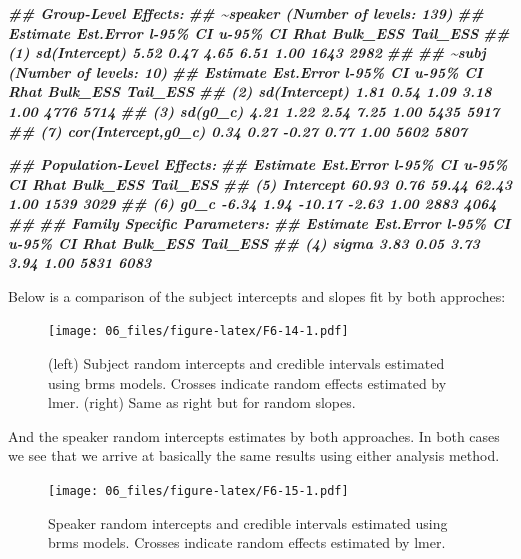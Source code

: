 \documentclass[
]{book}
\newenvironment{Shaded}{\begin{snugshade}}{\end{snugshade}}
\newcommand{\DocumentationTok}[1]{\textcolor[rgb]{0.56,0.35,0.01}{\textbf{\textit{#1}}}}
\begin{document}
\begin{Shaded}
\begin{Highlighting}[]
\DocumentationTok{\#\# Group{-}Level Effects: }
\DocumentationTok{\#\# \textasciitilde{}speaker (Number of levels: 139) }
\DocumentationTok{\#\#               Estimate Est.Error l{-}95\% CI u{-}95\% CI Rhat Bulk\_ESS Tail\_ESS}
\DocumentationTok{\#\# (1) sd(Intercept)     5.52      0.47     4.65     6.51 1.00     1643     2982}
\DocumentationTok{\#\# }
\DocumentationTok{\#\# \textasciitilde{}subj (Number of levels: 10) }
\DocumentationTok{\#\#                     Estimate Est.Error l{-}95\% CI u{-}95\% CI Rhat Bulk\_ESS Tail\_ESS}
\DocumentationTok{\#\# (2) sd(Intercept)           1.81      0.54     1.09     3.18 1.00     4776     5714}
\DocumentationTok{\#\# (3) sd(g0\_c)                4.21      1.22     2.54     7.25 1.00     5435     5917}
\DocumentationTok{\#\# (7) cor(Intercept,g0\_c)     0.34      0.27    {-}0.27     0.77 1.00     5602     5807}

\DocumentationTok{\#\# Population{-}Level Effects: }
\DocumentationTok{\#\#           Estimate Est.Error l{-}95\% CI u{-}95\% CI Rhat Bulk\_ESS Tail\_ESS}
\DocumentationTok{\#\# (5) Intercept    60.93      0.76    59.44    62.43 1.00     1539     3029}
\DocumentationTok{\#\# (6) g0\_c         {-}6.34      1.94   {-}10.17    {-}2.63 1.00     2883     4064}
\DocumentationTok{\#\# }
\DocumentationTok{\#\# Family Specific Parameters: }
\DocumentationTok{\#\#       Estimate Est.Error l{-}95\% CI u{-}95\% CI Rhat Bulk\_ESS Tail\_ESS}
\DocumentationTok{\#\# (4) sigma     3.83      0.05     3.73     3.94 1.00     5831     6083}
\end{Highlighting}
\end{Shaded}

Below is a comparison of the subject intercepts and slopes fit by both approches:

\begin{figure}
\centering
\texttt{[image: 06\_files/figure-latex/F6-14-1.pdf]}
\caption{\label{fig:F6-14}(left) Subject random intercepts and credible intervals estimated using brms models. Crosses indicate random effects estimated by lmer. (right) Same as right but for random slopes.}
\end{figure}

And the speaker random intercepts estimates by both approaches. In both cases we see that we arrive at basically the same results using either analysis method.

\begin{figure}
\centering
\texttt{[image: 06\_files/figure-latex/F6-15-1.pdf]}
\caption{\label{fig:F6-15}Speaker random intercepts and credible intervals estimated using brms models. Crosses indicate random effects estimated by lmer.}
\end{figure}
\end{document}
